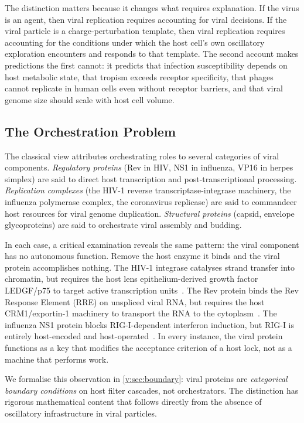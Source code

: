 The distinction matters because it changes what requires explanation. If the virus is an agent, then viral replication requires accounting for viral decisions. If the viral particle is a charge-perturbation template, then viral replication requires accounting for the conditions under which the host cell's own oscillatory exploration encounters and responds to that template. The second account makes predictions the first cannot: it predicts that infection susceptibility depends on host metabolic state, that tropism exceeds receptor specificity, that phages cannot replicate in human cells even without receptor barriers, and that viral genome size should scale with host cell volume.

\subsection{The Orchestration Problem}

The classical view attributes orchestrating roles to several categories of viral components. \textit{Regulatory proteins} (Rev in HIV, NS1 in influenza, VP16 in herpes simplex) are said to direct host transcription and post-transcriptional processing. \textit{Replication complexes} (the HIV-1 reverse transcriptase-integrase machinery, the influenza polymerase complex, the coronavirus replicase) are said to commandeer host resources for viral genome duplication. \textit{Structural proteins} (capsid, envelope glycoproteins) are said to orchestrate viral assembly and budding.

In each case, a critical examination reveals the same pattern: the viral component has no autonomous function. Remove the host enzyme it binds and the viral protein accomplishes nothing. The HIV-1 integrase catalyses strand transfer into chromatin, but requires the host lens epithelium-derived growth factor LEDGF/p75 to target active transcription units~\cite{Engelman2012}. The Rev protein binds the Rev Response Element (RRE) on unspliced viral RNA, but requires the host CRM1/exportin-1 machinery to transport the RNA to the cytoplasm~\cite{Malim1989}. The influenza NS1 protein blocks RIG-I-dependent interferon induction, but RIG-I is entirely host-encoded and host-operated~\cite{Gack2009}. In every instance, the viral protein functions as a key that modifies the acceptance criterion of a host lock, not as a machine that performs work.

We formalise this observation in \cref{v:sec:boundary}: viral proteins are \emph{categorical boundary conditions} on host filter cascades, not orchestrators. The distinction has rigorous mathematical content that follows directly from the absence of oscillatory infrastructure in viral particles.

